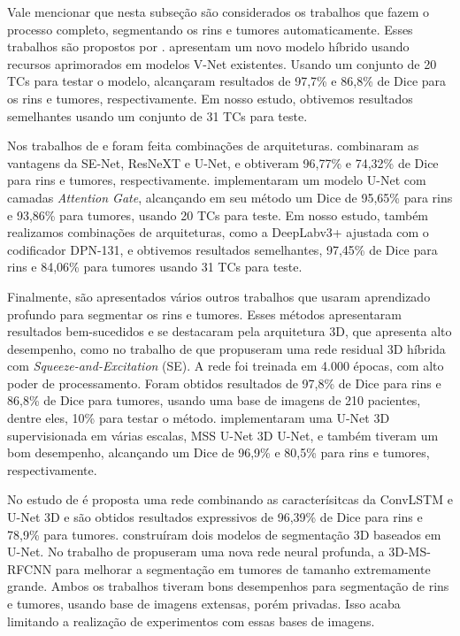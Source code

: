 Vale mencionar que nesta subseção são considerados os trabalhos que fazem o processo completo, segmentando os rins e tumores automaticamente. Esses trabalhos são propostos por .  apresentam um novo modelo híbrido usando recursos aprimorados em modelos V-Net existentes. Usando um conjunto de 20 TCs para testar o modelo, alcançaram resultados de 97,7\% e 86,8\% de Dice para os rins e tumores, respectivamente. Em nosso estudo, obtivemos resultados semelhantes usando um conjunto de 31 TCs para teste.

Nos trabalhos de  e  foram feita combinações de arquiteturas.  combinaram as vantagens da SE-Net, ResNeXT e U-Net, e obtiveram 96,77\% e 74,32\% de Dice para rins e tumores, respectivamente.  implementaram um modelo U-Net com camadas \textit{Attention Gate}, alcançando em seu método um Dice de 95,65\% para rins e 93,86\% para tumores, usando 20 TCs para teste. Em nosso estudo, também realizamos combinações de arquiteturas, como a DeepLabv3+ ajustada com o codificador DPN-131, e obtivemos resultados semelhantes, 97,45\% de Dice para rins e 84,06\% para tumores usando 31 TCs para teste.

Finalmente, são apresentados vários outros trabalhos que usaram aprendizado profundo para segmentar os rins e tumores. Esses métodos apresentaram resultados bem-sucedidos e se destacaram pela arquitetura 3D, que apresenta alto desempenho, como no trabalho de  que propuseram uma rede residual 3D híbrida com \textit{Squeeze-and-Excitation} (SE). A rede foi treinada em 4.000 épocas, com alto poder de processamento. Foram obtidos resultados de 97,8\% de Dice para rins e 86,8\% de Dice para tumores, usando uma base de imagens de 210 pacientes, dentre eles, 10\% para testar o método.  implementaram uma U-Net 3D supervisionada em várias escalas, MSS U-Net 3D U-Net, e também tiveram um bom desempenho, alcançando um Dice de 96,9\% e 80,5\% para rins e tumores, respectivamente.

No estudo de  é proposta uma rede combinando as caracterísitcas da ConvLSTM e U-Net 3D e são obtidos resultados expressivos de 96,39\% de Dice para rins e 78,9\% para tumores.  construíram dois modelos de segmentação 3D baseados em U-Net. No trabalho de  propuseram uma nova rede neural profunda, a 3D-MS-RFCNN para melhorar a segmentação em tumores de tamanho extremamente grande. Ambos os trabalhos tiveram bons desempenhos para segmentação de rins e tumores, usando base de imagens extensas, porém privadas. Isso acaba limitando a realização de experimentos com essas bases de imagens.

